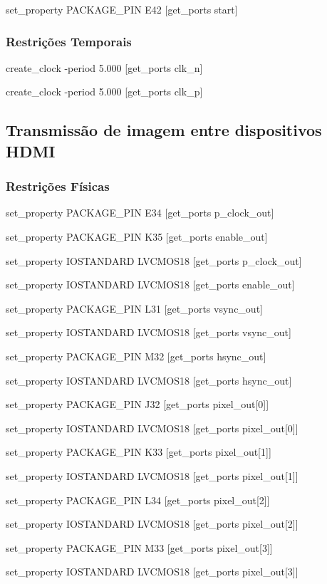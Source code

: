 set\_property PACKAGE\_PIN E42 [get\_ports start]

\subsubsection{Restrições Temporais} \label{ap2:planA_timing_cnstrs}

create\_clock -period 5.000 [get\_ports clk\_n]

create\_clock -period 5.000 [get\_ports clk\_p]

\subsection{Transmissão de imagem entre dispositivos HDMI} \label{subsub:ap2planB}

\subsubsection{Restrições Físicas} \label{ap2:planB_physical_cnstrs}

set\_property PACKAGE\_PIN E34 [get\_ports p\_clock\_out]

set\_property PACKAGE\_PIN K35 [get\_ports enable\_out]

set\_property IOSTANDARD LVCMOS18 [get\_ports p\_clock\_out]

set\_property IOSTANDARD LVCMOS18 [get\_ports enable\_out]

set\_property PACKAGE\_PIN L31 [get\_ports vsync\_out]

set\_property IOSTANDARD LVCMOS18 [get\_ports vsync\_out]

set\_property PACKAGE\_PIN M32 [get\_ports hsync\_out]

set\_property IOSTANDARD LVCMOS18 [get\_ports hsync\_out]

set\_property PACKAGE\_PIN J32 [get\_ports {pixel\_out[0]}]

set\_property IOSTANDARD LVCMOS18 [get\_ports {pixel\_out[0]}]

set\_property PACKAGE\_PIN K33 [get\_ports {pixel\_out[1]}]

set\_property IOSTANDARD LVCMOS18 [get\_ports {pixel\_out[1]}]

set\_property PACKAGE\_PIN L34 [get\_ports {pixel\_out[2]}]

set\_property IOSTANDARD LVCMOS18 [get\_ports {pixel\_out[2]}]

set\_property PACKAGE\_PIN M33 [get\_ports {pixel\_out[3]}]

set\_property IOSTANDARD LVCMOS18 [get\_ports {pixel\_out[3]}]


